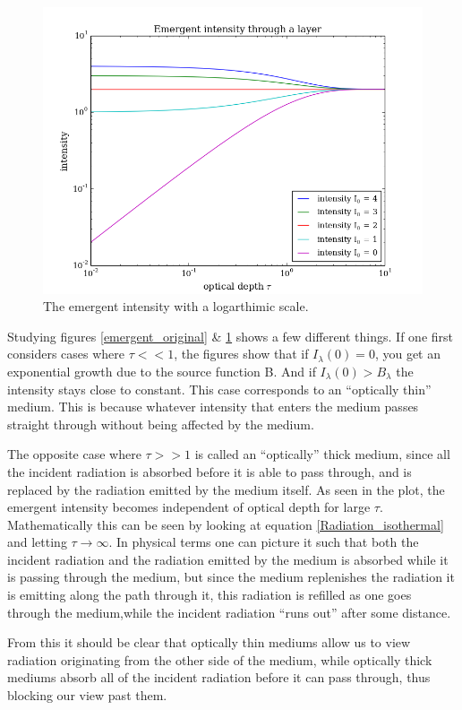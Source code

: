 \documentclass{aa}   %
\begin{document}
\begin{figure}
 \includegraphics[width=.49\textwidth]{emergent_log.png}
 \caption{The emergent intensity with a logarthimic scale.}
 \label{emergent_log}
\end{figure}
Studying figures \ref{emergent_original} \& \ref{emergent_log} shows a few different things.
If one first considers cases where $\tau << 1$, the figures show that if $I_\lambda(0) = 0$, you get an exponential growth due to the source function B. And if $I_\lambda(0) > B_\lambda$ the intensity stays close to constant. This case corresponds to an ``optically thin'' medium. This is because whatever intensity that enters the medium passes straight through without being affected by the medium.

The opposite case where $\tau >> 1$ is called an ``optically'' thick medium, since all the incident radiation is absorbed before it is able to pass through, and is replaced by the radiation emitted by the medium itself. As seen in the plot, the emergent intensity becomes independent of optical depth for large $\tau$. Mathematically this can be seen by looking at equation \ref{Radiation_isothermal} and letting $\tau \rightarrow \infty$. In physical terms one can picture it such that both the incident radiation and the radiation emitted by the medium is absorbed while it is passing through the medium, but since the medium replenishes the radiation it is emitting along the path through it, this radiation is refilled as one goes through the medium,while the incident radiation ``runs out'' after some distance.

From this it should be clear that optically thin mediums allow us to view radiation originating from the other side of the medium, while optically thick mediums absorb all of the incident radiation before it can pass through, thus blocking our view past them.
\end{document}
